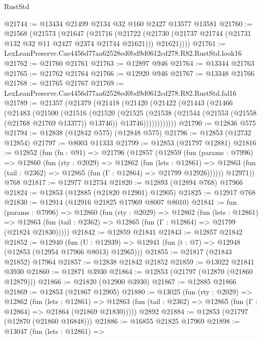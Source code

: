 \begin{lexlean}{RustStd}
\begin{coremodule}
@21744 := @13434 @21499 @2134 @32 @160 @2427 @13577 @13581
@21760 := @21568
    (@21573
      (@21647
        (@21716
          (@21722
            (@21730 (@21737 @21744 (@21731 @132 @32 @11 @2427 @2374 @21744 @21621)))
            @21621))))
@21761 := LexLeanPreserve.Cae4456d77aa62528ed0bd9d0612cd278.R82.RustStd.look16
@21762 := @21760 @21761
@21763 := @12897 @946
@21764 := @13344 @21763
@21765 := @21762 @21764
@21766 := @12920 @946
@21767 := @13348 @21766
@21768 := @21765 @21767
@21769 := LexLeanPreserve.Cae4456d77aa62528ed0bd9d0612cd278.R82.RustStd.fal16
@21789 := @21357
    (@21379
      (@21418
        (@21420
          (@21422
            (@21443
              (@21466
                (@21483
                  (@21500
                    (@21516
                      (@21520
                        (@21525
                          (@21538
                            (@21544 (@21553 (@21558 (@21768 @21769 @13377)) @13746))
                            @13746))))))))))))
@21790 := @12836 @575
@21794 := @12838 (@12842 @575) (@12848 @575)
@21796 := @12853 (@12732 @12854)
@21797 := @8003 @11333
@21799 := @12853 (@21797 @12881)
@21816 := @12852
    (fun (fn : @91) =>
    @21796
      (@12857
        (@12859
          (fun (params : @7996) =>
          @12860
            (fun (rty : @2029) =>
            @12862
              (fun (lets : @12861) =>
              @12863 (fun (tail : @2362) => @12865 (fun (Γ : @12864) => @21799 @12926))))))
        @12971))
    @768
@21817 := @12977 @12734
@21820 := @12893 (@12894 @768) @17966
@21824 := @12853 (@12885 (@21820 @12901) @12905)
@21825 := @12917 @768
@21830 := @12914 (@12916 @21825 @17969 @8007 @8010)
@21841 := fun (params : @7996) =>
  @12860
    (fun (rty : @2029) =>
    @12862
      (fun (lets : @12861) =>
      @12863 (fun (tail : @2362) => @12865 (fun (Γ : @12864) => @21799 (@21824 @21830)))))
@21842 := @12859 @21841
@21843 := @12857 @21842
@21852 := @12940
    (fun (U : @12939) => @12941 (fun (t : @7) => @12948 (@12853 (@12954 @17966 @8013) @12965)))
@21855 := @21817 (@21843 @21852) @17964
@21857 := @12838 @21842 @21852
@21859 := @13022 @21841 @3930
@21860 := @12871 @3930
@21864 := @12853 (@21797 (@12870 (@21860 @12879)))
@21866 := @21820 (@12900 @3930)
@21867 := @12885 @21866
@21869 := @12853 (@21867 @12905)
@21880 := @13025
    (fun (rty : @2029) =>
    @12862
      (fun (lets : @12861) =>
      @12863 (fun (tail : @2362) => @12865 (fun (Γ : @12864) => @21864 (@21869 @21830)))))
    @2892
@21884 := @12853 (@21797 (@12870 (@21860 @16848)))
@21886 := @16855 @21825 @17969
@21898 := @13047
    (fun (lets : @12861) =>

\end{coremodule}
\end{lexlean}
